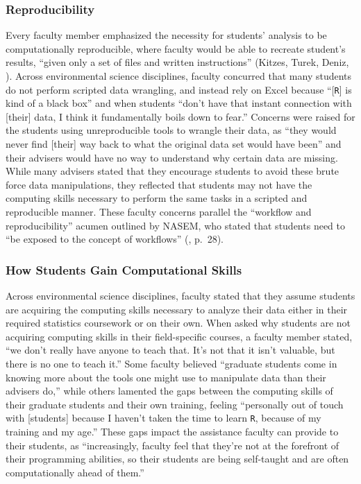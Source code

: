 \documentclass[12pt]{article}
\begin{document}
\subsubsection{Reproducibility}  

\noindent Every faculty member emphasized the necessity for students' analysis
to be computationally reproducible, where faculty would be able to recreate 
student's results, ``given only a set of files and written instructions''
(Kitzes, Turek, Deniz, \citeyear{reproducible}). Across environmental science
disciplines, faculty concurred that many students do not perform scripted data
wrangling, and instead rely on Excel because ``[\texttt{R}] is kind of a black
box'' and when students ``don't have that instant connection with [their] data,
I think it fundamentally boils down to fear.'' Concerns were raised for the
students using unreproducible tools to wrangle their data, as ``they would never
find [their] way back to what the original data set would have been'' and their
advisers would have no way to understand why certain data are missing. While
many advisers stated that they encourage students to avoid these brute force
data manipulations, they reflected that students may not have the computing
skills necessary to perform the same tasks in a scripted and reproducible
manner. These faculty concerns parallel the ``workflow and reproducibility''
acumen outlined by NASEM, who stated that students need to ``be exposed to the
concept of workflows'' (\citeyear{nas}, p.\ 28). 

\subsubsection{How Students Gain Computational Skills}

\noindent Across environmental science disciplines, faculty stated that they 
assume students are acquiring the computing skills necessary to analyze their 
data either in their required statistics coursework or on their own. When asked
why students are not acquiring computing skills in their field-specific courses,
a faculty member stated, ``we don't really have anyone to teach that. It's not
that it isn't valuable, but there is no one to teach it.'' Some faculty believed
``graduate students come in knowing more about the tools one might use to
manipulate data than their advisers do,'' while others lamented the gaps between
the computing skills of their graduate students and their own training,
feeling ``personally out of touch with [students] because I haven't taken the
time to learn \texttt{R}, because of my training and my age.'' These gaps impact
the assistance faculty can provide to their students, as ``increasingly, faculty
feel that they're not at the forefront of their programming abilities, so their
students are being self-taught and are often computationally ahead of them.''
\end{document}
